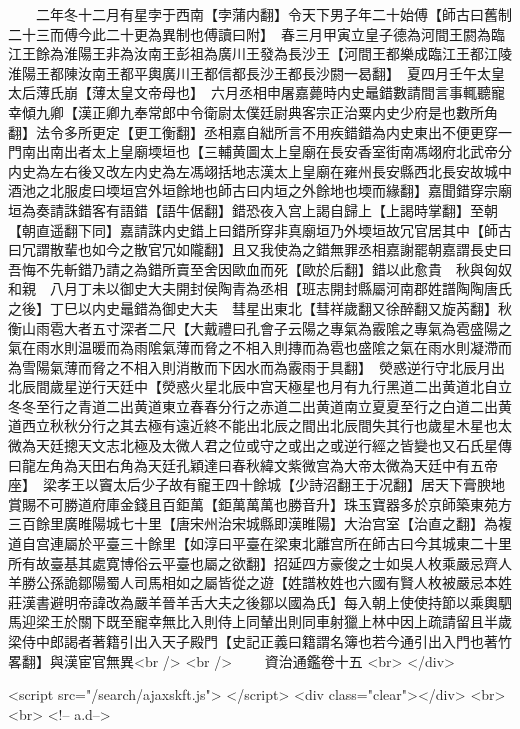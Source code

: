　　二年冬十二月有星孛于西南【孛蒲内翻】令天下男子年二十始傅【師古曰舊制二十三而傅今此二十更為異制也傅讀曰附】　春三月甲寅立皇子德為河間王閼為臨江王餘為淮陽王非為汝南王彭祖為廣川王發為長沙王【河間王都樂成臨江王都江陵淮陽王都陳汝南王都平輿廣川王都信都長沙王都長沙閼一曷翻】　夏四月壬午太皇太后薄氏崩【薄太皇文帝母也】　六月丞相申屠嘉薨時内史鼂錯數請間言事輒聽寵幸傾九卿【漢正卿九奉常郎中令衛尉太僕廷尉典客宗正治粟内史少府是也數所角翻】法令多所更定【更工衡翻】丞相嘉自絀所言不用疾錯錯為内史東出不便更穿一門南出南出者太上皇廟堧垣也【三輔黄圖太上皇廟在長安香室街南馮翊府北武帝分内史為左右後又改左内史為左馮翊括地志漢太上皇廟在雍州長安縣西北長安故城中酒池之北服䖍曰堧垣宫外垣餘地也師古曰内垣之外餘地也堧而緣翻】嘉聞錯穿宗廟垣為奏請誅錯客有語錯【語牛倨翻】錯恐夜入宫上謁自歸上【上謁時掌翻】至朝【朝直遥翻下同】嘉請誅内史錯上曰錯所穿非真廟垣乃外堧垣故冗官居其中【師古曰冗謂散輩也如今之散官冗如隴翻】且又我使為之錯無罪丞相嘉謝罷朝嘉謂長史曰吾悔不先斬錯乃請之為錯所賣至舍因歐血而死【歐於后翻】錯以此愈貴　秋與匈奴和親　八月丁未以御史大夫開封侯陶青為丞相【班志開封縣屬河南郡姓譜陶陶唐氏之後】丁巳以内史鼂錯為御史大夫　彗星出東北【彗祥歲翻又徐醉翻又旋芮翻】秋衡山雨雹大者五寸深者二尺【大戴禮曰孔會子云陽之專氣為霰隂之專氣為雹盛陽之氣在雨水則温暖而為雨隂氣薄而脅之不相入則摶而為雹也盛隂之氣在雨水則凝滯而為雪陽氣薄而脅之不相入則消散而下因水而為霰雨于具翻】　熒惑逆行守北辰月出北辰間歲星逆行天廷中【熒惑火星北辰中宫天極星也月有九行黑道二出黄道北自立冬冬至行之青道二出黄道東立春春分行之赤道二出黄道南立夏夏至行之白道二出黄道西立秋秋分行之其去極有遠近終不能出北辰之間出北辰間失其行也歲星木星也太微為天廷摠天文志北極及太微人君之位或守之或出之或逆行經之皆變也又石氏星傳曰龍左角為天田右角為天廷孔穎達曰春秋緯文紫微宫為大帝太微為天廷中有五帝座】　梁孝王以竇太后少子故有寵王四十餘城【少詩沼翻王于况翻】居天下膏腴地賞賜不可勝道府庫金錢且百鉅萬【鉅萬萬萬也勝音升】珠玉寶器多於京師築東苑方三百餘里廣睢陽城七十里【唐宋州治宋城縣即漢睢陽】大治宫室【治直之翻】為複道自宫連屬於平臺三十餘里【如淳曰平臺在梁東北離宫所在師古曰今其城東二十里所有故臺基其處寛博俗云平臺也屬之欲翻】招延四方豪俊之士如吳人枚乘嚴忌齊人羊勝公孫詭鄒陽蜀人司馬相如之屬皆從之遊【姓譜枚姓也六國有賢人枚被嚴忌本姓莊漢書避明帝諱改為嚴羊晉羊舌大夫之後鄒以國為氏】每入朝上使使持節以乘輿駟馬迎梁王於關下既至寵幸無比入則侍上同輦出則同車射獵上林中因上疏請留且半歲梁侍中郎謁者著籍引出入天子殿門【史記正義曰籍謂名簿也若今通引出入門也著竹畧翻】與漢宦官無異<br />
<br />
　　資治通鑑卷十五  <br>
   </div> 

<script src="/search/ajaxskft.js"> </script>
 <div class="clear"></div>
<br>
<br>
 <!-- a.d-->

